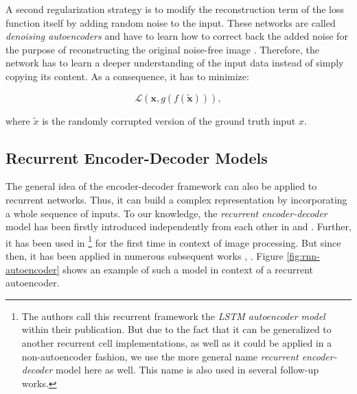 A second regularization strategy is to modify the reconstruction term of the loss function itself by adding random noise to the input. These networks are called \textit{denoising autoencoders} and have to learn how to correct back the added noise for the purpose of reconstructing the original noise-free image \parencite[p. 507]{deep_learning}. Therefore, the network has to learn a deeper understanding of the input data instead of simply copying its content. As a consequence, it has to minimize:

\begin{equation} \label{eq:autoenc-denoise}
	\mathcal{L}(\textbf{x}, g(f(\tilde{\textbf{x}}))) ,
\end{equation}

where $ \tilde{x} $ is the randomly corrupted version of the ground truth input $ x $.


\subsection{Recurrent Encoder-Decoder Models} \label{sec:rnn_enc_dec}

The general idea of the encoder-decoder framework can also be applied to recurrent networks. Thus, it can build a complex representation by incorporating a whole sequence of inputs. To our knowledge, the \textit{recurrent encoder-decoder} model has been firstly introduced independently from each other in \parencite{brnn_fist} and \parencite{brnn_second}. Further, it has been used in  \parencite{unsup_learn_lstm}\footnote{The authors call this recurrent framework the \textit{LSTM autoencoder model} within their publication. But due to the fact that it can be generalized to another recurrent cell implementations, as well as it could be applied in a non-autoencoder fashion, we use the more general name \textit{recurrent encoder-decoder} model here as well. This name is also used in several follow-up works.} for the first time in context of image processing. But since then, it has been applied in numerous subsequent works \parencite{rnn-enc-dec1}, \parencite{rnn-enc-dec2}. Figure \ref{fig:rnn-autoencoder} shows an example of such a model in context of a recurrent autoencoder.

